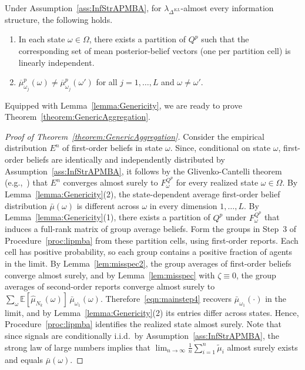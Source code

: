 \documentclass[12pt,reqno]{amsart}
\begin{document}
\begin{lemma}\label{lemma:Genericity}
Under Assumption~\ref{ass:InfStrAPMBA}, for $\lambda_{\Delta^{KL}}$-almost every information structure, the following holds.
\begin{enumerate}
    \item In each state $\omega \in \Omega$, there exists a partition of $Q^p$ such that the corresponding set of mean posterior-belief vectors (one per partition cell) is linearly independent.
\item $\overline{\mu}_{\omega_j}^p(\omega) \neq \overline{\mu}_{\omega_j}^p(\omega')$ for all $j=1,\ldots,L$ and $\omega \neq \omega'$.
\end{enumerate}
\end{lemma}
Equipped with Lemma~\ref{lemma:Genericity}, we are ready to prove Theorem~\ref{theorem:GenericAggregation}.
\begin{proof}[Proof of Theorem~\ref{theorem:GenericAggregation}]
    Consider the empirical distribution $E^n$ of first-order beliefs in state $\omega$. Since, conditional on state $\omega$, first-order beliefs are identically and independently distributed by Assumption~\ref{ass:InfStrAPMBA}, it follows by the Glivenko-Cantelli theorem (e.g.,~\cite{vandervaartwellner1996}) that $E^n$ converges almost surely to $F_\omega^{Q^p}$ for every realized state $\omega \in \Omega$. By Lemma~\ref{lemma:Genericity}(2), the state-dependent average first-order belief distribution $\bar{\mu}(\omega)$ is different across $\omega$ in every dimension $1,\ldots,L$. By Lemma~\ref{lemma:Genericity}(1), there exists a partition of $Q^p$ under $F_\omega^{Q^p}$ that induces a full-rank matrix of group average beliefs. Form the groups in Step~3 of Procedure~\ref{proc:lipmba} from these partition cells, using first-order reports. Each cell has positive probability, so each group contains a positive fraction of agents in the limit. By Lemma~\ref{lem:misspec2}, the group averages of first-order beliefs converge almost surely, and by Lemma~\ref{lem:misspec} with $\zeta\equiv 0$, the group averages of second-order reports converge almost surely to $\sum_{\omega}\mathbb{E}[\hat\mu_{N_k}(\omega)]\,\bar\mu_{\omega_1}(\omega)$. Therefore~\eqref{eqn:mainstep4} recovers $\bar\mu_{\omega_1}(\cdot)$ in the limit, and by Lemma~\ref{lemma:Genericity}(2) its entries differ across states. Hence, Procedure~\ref{proc:lipmba} identifies the realized state almost surely. Note that since signals are conditionally i.i.d.\ by Assumption~\ref{ass:InfStrAPMBA}, the strong law of large numbers implies that $\lim_{n\rightarrow \infty}\frac1n \sum_{i=1}^n \tilde{\mu}_i$ almost surely exists and equals $\bar{\mu}(\omega)$.
\end{proof}
\end{document}
